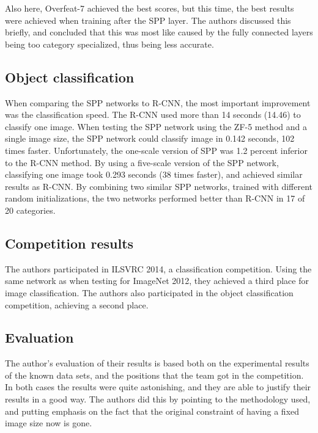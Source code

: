 Also here, Overfeat-7 achieved the best scores, but this time, the best results were achieved when training after the SPP layer. The authors discussed this briefly, and concluded that this was most like caused by the fully connected layers being too category specialized, thus being less accurate.

\subsection{Object classification}
When comparing the SPP networks to R-CNN, the most important improvement was the classification speed. The R-CNN used more than 14 seconds (14.46) to classify one image. When testing the SPP network using the ZF-5 method and a single image size, the SPP network could classify image in 0.142 seconds, 102 times faster. Unfortunately, the one-scale version of SPP was 1.2 percent inferior to the R-CNN method. By using a five-scale version of the SPP network, classifying one image took 0.293 seconds (38 times faster), and achieved similar results as R-CNN. By combining two similar SPP networks, trained with different random initializations, the two networks performed better than R-CNN in 17 of 20 categories.

\subsection{Competition results}
The authors participated in ILSVRC 2014, a classification competition. Using the same network as when testing for ImageNet 2012, they achieved a third place for image classification. The authors also participated in the object classification competition, achieving a second place.


\subsection{Evaluation}
The author's evaluation of their results is based both on the experimental results of the known data sets, and the positions that the team got in the competition. In both cases the results were quite astonishing, and they are able to justify their results in a good way. The authors did this by pointing to the methodology used, and putting emphasis on the fact that the original constraint of having a fixed image size now is gone. 


